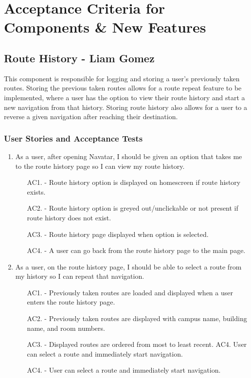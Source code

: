 \documentclass{scrreprt}
\begin{document}
\chapter{Acceptance Criteria for Components \& New Features}

\section{Route History - Liam Gomez}

This component is responsible for logging and storing a user’s previously taken routes. Storing the previous taken routes allows for a route repeat feature to be implemented, where a user has the option to view their route history and start a new navigation from that history. Storing route history also allows for a user to a reverse a given navigation after reaching their destination.


\subsection{User Stories and Acceptance Tests}
\begin{enumerate}
	\item As a user, after opening Navatar, I should be given an option that takes me to the route history page so I can view my route history.
	
		\begin{itemize}
			\item [AC1.] - Route history option is displayed on homescreen if route history exists.
			
			\item [AC2.] - Route history option is greyed out/unclickable or not present if route history does not exist.

			\item [AC3.] - Route history page displayed when option is selected.

			\item [AC4.] - A user can go back from the route history page to the main page.

		\end{itemize}
	
	\item As a user, on the route history page, I should be able to select a route from my history so I can repeat that navigation.
	
		\begin{itemize}
			\item [AC1.] - Previously taken routes are loaded and displayed when a user enters the route history page.
			\item [AC2.] - Previously taken routes are displayed with campus name, building name, and room numbers.
			\item [AC3.] - Displayed routes are ordered from most to least recent.
AC4. User can select a route and immediately start navigation.
			\item [AC4.] - User can select a route and immediately start navigation.
		\end{itemize}
\end{enumerate}
\end{document}
